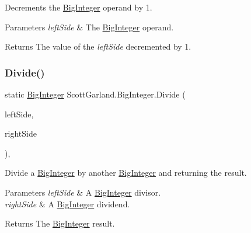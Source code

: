 Decrements the \hyperlink{class_scott_garland_1_1_big_integer}{Big\+Integer} operand by 1. 


\begin{DoxyParams}{Parameters}
{\em left\+Side} & The \hyperlink{class_scott_garland_1_1_big_integer}{Big\+Integer} operand.\\
\hline
\end{DoxyParams}
\begin{DoxyReturn}{Returns}
The value of the {\itshape left\+Side}  decremented by 1.
\end{DoxyReturn}
\mbox{\label{class_scott_garland_1_1_big_integer_a98eadd02148a503be9ca7fb7929224da}} 
\subsubsection{\texorpdfstring{Divide()}{Divide()}}
{\footnotesize\ttfamily static \hyperlink{class_scott_garland_1_1_big_integer}{Big\+Integer} Scott\+Garland.\+Big\+Integer.\+Divide (\begin{DoxyParamCaption}\item[{\hyperlink{class_scott_garland_1_1_big_integer}{Big\+Integer}}]{left\+Side,  }\item[{\hyperlink{class_scott_garland_1_1_big_integer}{Big\+Integer}}]{right\+Side }\end{DoxyParamCaption})\hspace{0.3cm}{\ttfamily [inline]}, {\ttfamily [static]}}



Divide a \hyperlink{class_scott_garland_1_1_big_integer}{Big\+Integer} by another \hyperlink{class_scott_garland_1_1_big_integer}{Big\+Integer} and returning the result. 


\begin{DoxyParams}{Parameters}
{\em left\+Side} & A \hyperlink{class_scott_garland_1_1_big_integer}{Big\+Integer} divisor.\\
\hline
{\em right\+Side} & A \hyperlink{class_scott_garland_1_1_big_integer}{Big\+Integer} dividend.\\
\hline
\end{DoxyParams}
\begin{DoxyReturn}{Returns}
The \hyperlink{class_scott_garland_1_1_big_integer}{Big\+Integer} result.
\end{DoxyReturn}
\mbox{\label{class_scott_garland_1_1_big_integer_a1d708cffb8ea8f6667cf69dfd60e41d1}} 
